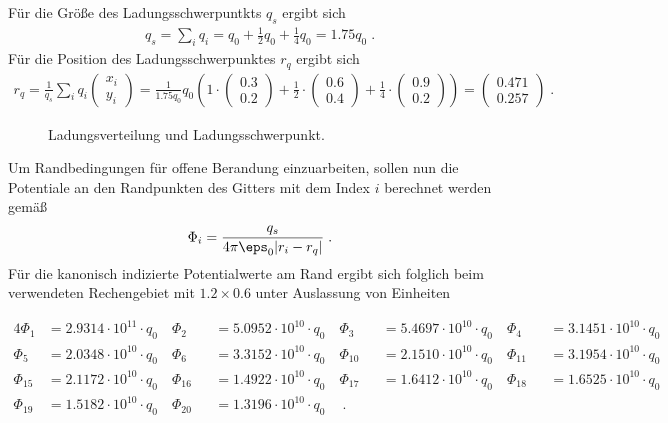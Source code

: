 \documentclass[./Protokollheft.tex]{subfiles}
\begin{document}
Für die Größe des Ladungsschwerpuntkts $q_s$ ergibt sich
\begin{align}
q_s=\sum\limits_{i}q_i=q_0+\frac{1}{2}q_0+\frac{1}{4}q_0=1.75q_0 \; .
\end{align}
Für die Position des Ladungsschwerpunktes $r_q$ ergibt sich
\begin{align}
r_q=\frac{1}{q_s}\sum\limits_{i}q_i 
\begin{pmatrix}
x_i \\
y_i
\end{pmatrix}
=\frac{1}{1.75q_0}
q_0
\left(
1\cdot
\begin{pmatrix}
0.3 \\
0.2
\end{pmatrix}
+
\frac{1}{2}\cdot
\begin{pmatrix}
0.6 \\
0.4
\end{pmatrix}
+
\frac{1}{4}\cdot
\begin{pmatrix}
0.9 \\
0.2
\end{pmatrix}
\right)
=
\begin{pmatrix}
0.471 \\
0.257
\end{pmatrix} \; .
\end{align}
\begin{figure}
\begin{center}
 
\caption{Ladungsverteilung und Ladungsschwerpunkt.}
\label{img:V4.Gitter2}
\end{center}
\end{figure}
Um Randbedingungen für offene Berandung einzuarbeiten, sollen nun die Potentiale an den Randpunkten des Gitters mit dem Index $i$ berechnet werden gemäß
\begin{align}
\Phi_i=\frac{q_s}{4\pi\eps_0 \lvert r_i-r_q\lvert} \; .
\end{align}
Für die kanonisch indizierte Potentialwerte am Rand ergibt sich folglich beim verwendeten Rechengebiet mit $ 1.2 \times 0.6$ unter Auslassung von Einheiten

\begin{alignat*}{4}
		\Phi_{1} &= 2.9314\cdot 10^{11}\cdot q_0 \quad
		\Phi_{2} && = 5.0952\cdot 10^{10}\cdot q_0  \quad
		\Phi_{3} &&= 5.4697\cdot 10^{10}\cdot q_0 \quad 
		\Phi_{4} &&= 3.1451\cdot 10^{10}\cdot q_0 \quad \\ 
		\Phi_{5} &= 2.0348\cdot 10^{10}\cdot q_0 \quad
		\Phi_{6} &&= 3.3152\cdot 10^{10}\cdot q_0  \quad
		\Phi_{10} &&= 2.1510\cdot 10^{10}\cdot q_0 \quad
		\Phi_{11} &&= 3.1954\cdot 10^{10}\cdot q_0 \quad  \\
		\Phi_{15} &= 2.1172\cdot 10^{10}\cdot q_0 \quad 
		\Phi_{16} &&= 1.4922\cdot 10^{10}\cdot q_0 \quad 
		\Phi_{17} &&= 1.6412\cdot 10^{10}\cdot q_0 \quad 
		\Phi_{18} &&= 1.6525\cdot 10^{10}\cdot q_0 \quad  \\
		\Phi_{19} &= 1.5182\cdot 10^{10}\cdot q_0 \quad 
		\Phi_{20} &&= 1.3196\cdot 10^{10}\cdot q_0 \quad \: .
\end{alignat*}
\end{document}
